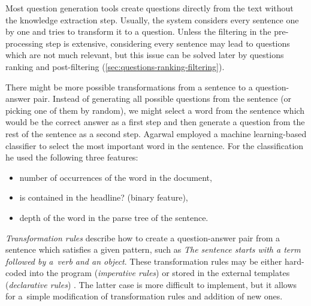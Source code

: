 \documentclass[12pt, twoside]{fithesis2}
\renewcommand{\_}{\leavevmode \kern0.07em\vbox{\hrule width0.4em}}
\newcommand{\squarebullet}{\textcolor{black}{\raisebox{0.15em}{\rule{4pt}{4pt}}}}
\newcommand{\emptysquarebullet}{\textcolor{black}{\raisebox{0.10em}{\tiny$\square$}}}
\newenvironment{myItemize}{
  \begin{itemize}[leftmargin=2em,rightmargin=1em,itemsep=\parskip ,parsep=0em,topsep=0em,partopsep=0em]
  \renewcommand{\labelitemi}{\squarebullet}
  \renewcommand{\labelitemii}{\textbullet}
}{
  \end{itemize}
}
\begin{document}
Most question generation tools create questions directly from the text without the knowledge extraction step.
Usually, the system considers every sentence one by one
and tries to transform it to a question.
Unless the filtering in the pre-processing step is extensive,
considering every sentence may lead to questions which are not much relevant,
but this issue can be solved later by questions ranking and post-filtering
(\autoref{sec:questions-ranking-filtering}).

There might be more possible transformations from a sentence to a question-answer pair.
Instead of generating all possible questions from the sentence (or picking one of them by random),
we might select a word from the sentence which would be the correct answer as a first step and then generate a question from the rest of the sentence as a second step.
Agarwal \cite{question-gen-textbooks} employed a machine learning-based classifier to select the most important word in the sentence. For the classification he used the following three features:
\begin{myItemize}
\item number of occurrences of the word in the document,
\item is contained in the headline? (binary feature),
\item depth of the word in the parse tree of the sentence.
\end{myItemize}

\textit{Transformation rules} describe how to create a question-answer pair from a sentence
which satisfies a given pattern,
such as \textit{The sentence starts with a term followed by a~verb and an object}.
These transformation rules may be either hard-coded into the program (\textit{imperative rules})
\cite{questions-wolfe, question-overgenerating-rating, question-gen-connectives}
or stored in the external templates (\textit{declarative rules})
\cite{question-gen-ceist, questions-eval}.
The latter case is more difficult to implement, but it allows for a~simple modification of transformation rules and addition of new ones.
\end{document}
